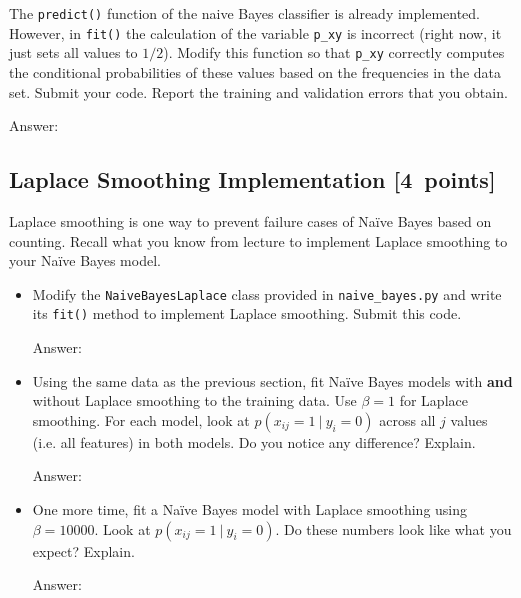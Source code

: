 \documentclass{article}
\newcommand{\blu}[1]{{\textcolor{blu}{#1}}}
\newenvironment{answer}{\par\begingroup\color{gre}Answer: }{\endgroup}
\let\ask\blu
\newcommand\pts[1]{\textcolor{pointscolour}{[#1~points]}}
\begin{document}
    The \texttt{predict()} function of the naive Bayes classifier is already implemented.
    However, in \texttt{fit()}
    the calculation of the variable \texttt{p\_xy} is incorrect
    (right now, it just sets all values to $1/2$).
    \ask{Modify this function so that \texttt{p\_xy} correctly
        computes the conditional probabilities of these values based on the
        frequencies in the data set. Submit your code. Report the training and validation errors that you obtain.}
    \begin{answer}

    \end{answer}
    \clearpage
    \subsection{Laplace Smoothing Implementation \pts{4}}

    Laplace smoothing is one way to prevent failure cases of Na\"ive Bayes based on counting. Recall what you know from lecture to implement Laplace smoothing to your Na\"ive Bayes model.
    \begin{itemize}
        \item Modify the \texttt{NaiveBayesLaplace} class provided in \texttt{naive\_bayes.py} and write its \texttt{fit()} method to implement Laplace smoothing. \ask{Submit this code.}
        \begin{answer}

        \end{answer}
        \item Using the same data as the previous section, fit Na\"ive Bayes models with \textbf{and} without Laplace smoothing to the training data. Use $\beta=1$ for Laplace smoothing. For each model, look at $p(x_{ij} = 1 \ | \ y_i = 0)$ across all $j$ values (i.e. all features) in both models. \ask{Do you notice any difference? Explain.}
        \begin{answer}

        \end{answer}
        \item One more time, fit a Na\"ive Bayes model with Laplace smoothing using $\beta=10000$. Look at $p(x_{ij} = 1 \ | \ y_i = 0)$. \ask{Do these numbers look like what you expect? Explain.}
        \begin{answer}

        \end{answer}
    \end{itemize}
\end{document}
